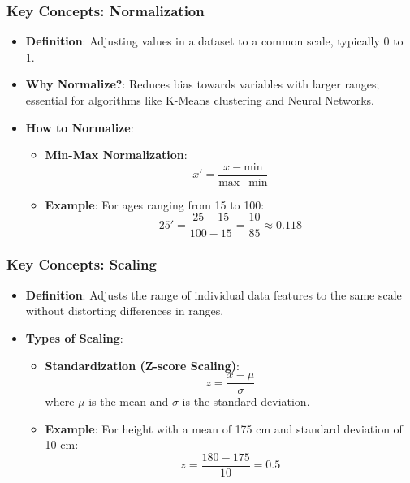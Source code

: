 \documentclass[aspectratio=169]{beamer}
\begin{document}
\begin{frame}
    \frametitle{Key Concepts: Normalization}
    \begin{itemize}
        \item \textbf{Definition}: Adjusting values in a dataset to a common scale, typically 0 to 1.
        \item \textbf{Why Normalize?}: Reduces bias towards variables with larger ranges; essential for algorithms like K-Means clustering and Neural Networks.
        \item \textbf{How to Normalize}:
            \begin{itemize}
                \item \textbf{Min-Max Normalization}:
                \begin{equation*}
                x' = \frac{x - \text{min}}{\text{max} - \text{min}}
                \end{equation*}
                \item \textbf{Example}: For ages ranging from 15 to 100:
                \begin{equation*}
                25' = \frac{25 - 15}{100 - 15} = \frac{10}{85} \approx 0.118
                \end{equation*}
            \end{itemize}
    \end{itemize}
\end{frame}

\begin{frame}
    \frametitle{Key Concepts: Scaling}
    \begin{itemize}
        \item \textbf{Definition}: Adjusts the range of individual data features to the same scale without distorting differences in ranges.
        \item \textbf{Types of Scaling}:
            \begin{itemize}
                \item \textbf{Standardization (Z-score Scaling)}:
                \begin{equation*}
                z = \frac{x - \mu}{\sigma}
                \end{equation*}
                where $\mu$ is the mean and $\sigma$ is the standard deviation.
                \item \textbf{Example}: For height with a mean of 175 cm and standard deviation of 10 cm:
                \begin{equation*}
                z = \frac{180 - 175}{10} = 0.5
                \end{equation*}
            \end{itemize}
    \end{itemize}
\end{frame}
\end{document}
